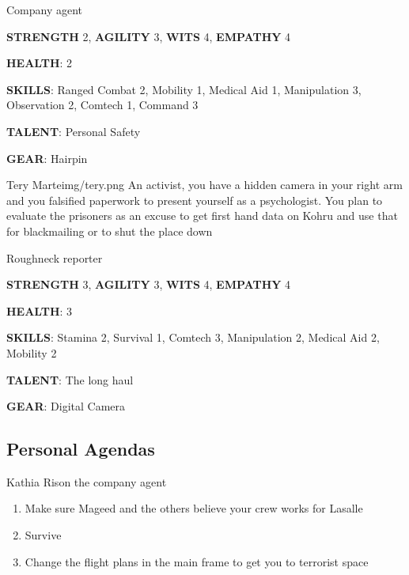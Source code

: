 \begin{rpg-commentbox}{}
    Company agent

    \textbf{STRENGTH} 2, \textbf{AGILITY} 3, \textbf{WITS} 4, \textbf{EMPATHY} 4

    \textbf{HEALTH}: 2

    \textbf{SKILLS}: Ranged Combat 2, Mobility 1, Medical Aid 1, Manipulation 3, Observation 2, Comtech 1, Command 3
    
    \textbf{TALENT}: Personal Safety
    
    \textbf{GEAR}: Hairpin
\end{rpg-commentbox}


\newsect

\begin{rpg-pcbox}{Tery Marte}{img/tery.png}
    An activist, you have a hidden camera in your right arm and you falsified paperwork to present yourself as a psychologist. You plan to evaluate the prisoners as an excuse to get first hand data on Kohru and use that for blackmailing or to shut the place down
\end{rpg-pcbox}

\begin{rpg-commentbox}{}
    Roughneck reporter

    \textbf{STRENGTH} 3, \textbf{AGILITY} 3, \textbf{WITS} 4, \textbf{EMPATHY} 4

    \textbf{HEALTH}: 3

    \textbf{SKILLS}: Stamina 2, Survival 1, Comtech 3, Manipulation 2, Medical Aid 2, Mobility 2
    
    \textbf{TALENT}: The long haul
    
    \textbf{GEAR}: Digital Camera
\end{rpg-commentbox}


\clearpage

\subsection{Personal Agendas}

\begin{rpg-commentbox}{Kathia Rison the company agent}
    \begin{enumerate}[label=\textbf{Act \arabic*}, leftmargin=1cm]
        \item Make sure Mageed and the others believe your crew works for Lasalle
        \item Survive
        \item Change the flight plans in the main frame to get you to terrorist space
    \end{enumerate}
    
\end{rpg-commentbox}


